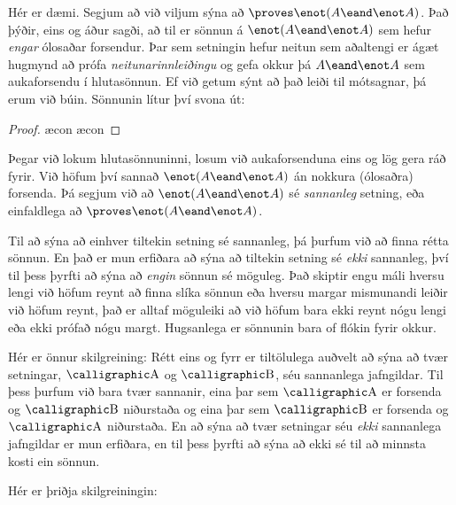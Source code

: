 Hér er dæmi. Segjum að við viljum sýna að ${}\proves \enot (A \eand \enot A)$. Það þýðir, eins og áður sagði, að til er sönnun á $\enot(A \eand \enot A)$ sem hefur \emph{engar} ólosaðar forsendur. Þar sem setningin hefur neitun sem aðaltengi er ágæt hugmynd að prófa \emph{neitunarinnleiðingu} og gefa okkur þá $A \eand \enot A$ sem aukaforsendu í hlutasönnun. Ef við getum sýnt að það leiði til mótsagnar, þá erum við búin. Sönnunin lítur því svona út:
	\begin{proof}
		\open
			\ae{con}
			\ae{con}
		\close
	\end{proof}
Þegar við lokum hlutasönnuninni, losum við aukaforsenduna eins og lög gera ráð fyrir. Við höfum því sannað $\enot (A \eand \enot A)$ án nokkura (ólosaðra) forsenda. Þá segjum við að $\enot (A \eand \enot A)$ sé \emph{sannanleg} setning, eða einfaldlega að ${}\proves \enot (A \eand \enot A)$.

Til að sýna að einhver tiltekin setning sé sannanleg, þá þurfum við að finna rétta sönnun. En það er mun erfiðara að sýna að tiltekin setning sé \emph{ekki} sannanleg, því til þess þyrfti að sýna að \emph{engin} sönnun sé möguleg. Það skiptir engu máli hversu lengi við höfum reynt að finna slíka sönnun eða hversu margar mismunandi leiðir við höfum reynt, það er alltaf möguleiki að við höfum bara ekki reynt nógu lengi eða ekki prófað nógu margt. Hugsanlega er sönnunin bara of flókin fyrir okkur.

Hér er önnur skilgreining:
Rétt eins og fyrr er tiltölulega auðvelt að sýna að tvær setningar, $\meta{A}$ og $\meta{B}$, séu sannanlega jafngildar. Til þess þurfum við bara tvær sannanir, eina þar sem $\meta{A}$ er forsenda og $\meta{B}$ niðurstaða og eina þar sem $\meta{B}$ er forsenda og $\meta{A}$ niðurstaða. En að sýna að tvær setningar séu \emph{ekki} sannanlega jafngildar er mun erfiðara, en til þess þyrfti að sýna að ekki sé til að minnsta kosti ein sönnun.
		
Hér er þriðja skilgreiningin:		

